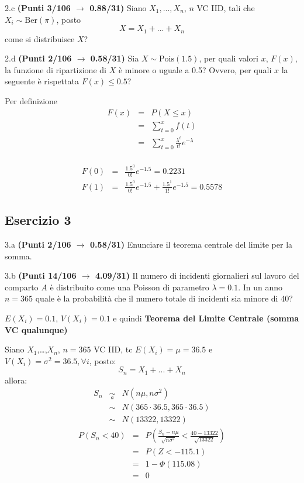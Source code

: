 \documentclass[
  11pt,
]{book}
\theoremstyle{mytheoremstyle}
\theoremstyle{mydefstyle}
\newenvironment{sol}
  {
  \begin{tcolorbox}[enhanced,breakable,arc=0.1mm,boxrule=1pt,colback=white,colframe=iblue,
  title=\bf \fontfamily{lmss}\selectfont \hspace{.5 cm} Soluzione,drop fuzzy shadow]

}{
\end{tcolorbox}
  }
\begin{document}
2.c \textbf{(Punti 3/106 \(\rightarrow\) 0.88/31)} Siano \(X_1,...,X_n\), \(n\) VC IID, tali che \(X_i\sim \text{Ber}(\pi)\), posto
\[
 X = X_1+...+X_n
\]
come si distribuisce \(X\)?

2.d \textbf{(Punti 2/106 \(\rightarrow\) 0.58/31)} Sia \(X\sim \text{Pois}(1.5)\), per quali valori \(x\), \(F(x)\), la funzione di ripartizione di \(X\) è minore o uguale a 0.5? Ovvero, per quali \(x\) la seguente è rispettata \(F(x)\le 0.5\)?

\begin{sol}
Per definizione
\begin{eqnarray*}
F(x)   &=&  P(X\le x)\\
       &=&\sum_{t=0}^x f(t)\\
       &=&\sum_{t=0}^x \frac{\lambda^t}{t!}e^{-\lambda}\\
\end{eqnarray*}

\begin{eqnarray*}
  F(0) &=&  \frac{1.5^0}{0!}e^{-1.5}=0.2231\\
  F(1) &=&  \frac{1.5^0}{0!}e^{-1.5}+  \frac{1.5^1}{1!}e^{-1.5}=0.5578
\end{eqnarray*}

\end{sol}

\subsection{Esercizio 3}\label{esercizio-3-8}

3.a \textbf{(Punti 2/106 \(\rightarrow\) 0.58/31)} Enunciare il teorema centrale del limite per la somma.

3.b \textbf{(Punti 14/106 \(\rightarrow\) 4.09/31)} Il numero di incidenti giornalieri sul lavoro del comparto \(A\) è distribuito come una
Poisson di parametro \(\lambda = 0.1\). In un anno \(n=365\) quale è la probabilità che il numero totale di
incidenti sia minore di 40?

\begin{sol}
\(E(X_i)=0.1\), \(V(X_i)=0.1\) e quindi
\textbf{Teorema del Limite Centrale (somma VC qualunque)}

Siano \(X_1\),\ldots,\(X_n\), \(n=365\) VC IID, tc \(E(X_i)=\mu=36.5\) e \(V(X_i)=\sigma^2=36.5,\forall i\), posto:
\[
      S_n = X_1 + ... + X_n
      \]
allora:\begin{eqnarray*}
  S_n & \mathop{\sim}\limits_{a}& N(n\mu,n\sigma^2) \\
     &\sim & N(365\cdot36.5,365\cdot36.5) \\
     &\sim & N(13322,13322) 
  \end{eqnarray*}\begin{eqnarray*}
      P( S_n   <   40 ) 
        &=& P\left(  \frac { S_n  -  n\mu }{ \sqrt{n\sigma^2} }  <  \frac { 40  -  13322 }{\sqrt{ 13322 }} \right)  \\
                 &=& P\left(  Z   <   -115.1 \right) \\    
                 &=&  1-\Phi( 115.08 ) \\ &=&  0 
      \end{eqnarray*}

\end{sol}
\end{document}
